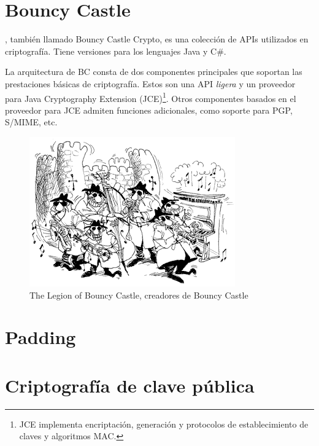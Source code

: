 
 \section{Bouncy Castle}

 , también llamado Bouncy Castle Crypto, es una colección de APIs utilizados en criptografía. Tiene versiones para los lenguajes Java y C\#.

 La arquitectura de BC consta de dos componentes principales que soportan las prestaciones básicas de criptografía.
 Estos son una API \emph{ligera} y un proveedor para Java Cryptography Extension (JCE)\footnote{JCE implementa encriptación, generación y protocolos de establecimiento de claves y algoritmos MAC.}.
 Otros componentes basados en el proveedor para JCE admiten funciones adicionales, como soporte para PGP, S/MIME, etc. \emph{\parencite{Reference4}}

 \begin{figure}[ht]
   \centering
   \includegraphics[scale=0.5]{Figures/BouncyCastle}
   \decoRule
   \caption[Legion of Bouncy Castle]{The Legion of Bouncy Castle, creadores de Bouncy Castle}
   \label{fig:BouncyCastle}
 \end{figure}


 \section{Padding}


 \section{Criptografía de clave pública}

